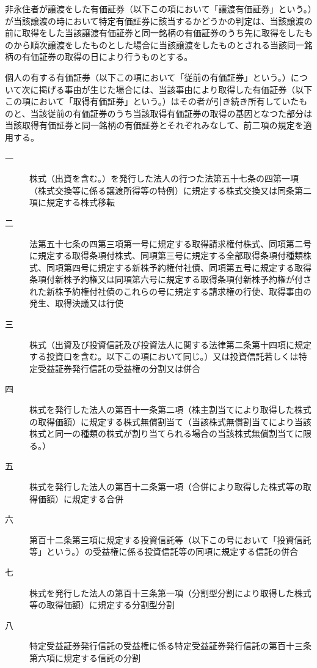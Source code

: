 \documentclass[twocolumn,a4j,10pt]{ltjtarticle}
\begin{document}
\begin{description}
\begin{description}
\end{description}
\item[\rensuji{2}]非永住者が譲渡をした有価証券（以下この項において「譲渡有価証券」という。）が当該譲渡の時において特定有価証券に該当するかどうかの判定は、当該譲渡の前に取得をした当該譲渡有価証券と同一銘柄の有価証券のうち先に取得をしたものから順次譲渡をしたものとした場合に当該譲渡をしたものとされる当該同一銘柄の有価証券の取得の日により行うものとする。
\item[\rensuji{3}]個人の有する有価証券（以下この項において「従前の有価証券」という。）について次に掲げる事由が生じた場合には、当該事由により取得した有価証券（以下この項において「取得有価証券」という。）はその者が引き続き所有していたものと、当該従前の有価証券のうち当該取得有価証券の取得の基因となつた部分は当該取得有価証券と同一銘柄の有価証券とそれぞれみなして、前二項の規定を適用する。
\begin{description}
\item[一]株式（出資を含む。）を発行した法人の行つた法第五十七条の四第一項（株式交換等に係る譲渡所得等の特例）に規定する株式交換又は同条第二項に規定する株式移転
\item[二]法第五十七条の四第三項第一号に規定する取得請求権付株式、同項第二号に規定する取得条項付株式、同項第三号に規定する全部取得条項付種類株式、同項第四号に規定する新株予約権付社債、同項第五号に規定する取得条項付新株予約権又は同項第六号に規定する取得条項付新株予約権が付された新株予約権付社債のこれらの号に規定する請求権の行使、取得事由の発生、取得決議又は行使
\item[三]株式（出資及び投資信託及び投資法人に関する法律第二条第十四項に規定する投資口を含む。以下この項において同じ。）又は投資信託若しくは特定受益証券発行信託の受益権の分割又は併合
\item[四]株式を発行した法人の第百十一条第二項（株主割当てにより取得した株式の取得価額）に規定する株式無償割当て（当該株式無償割当てにより当該株式と同一の種類の株式が割り当てられる場合の当該株式無償割当てに限る。）
\item[五]株式を発行した法人の第百十二条第一項（合併により取得した株式等の取得価額）に規定する合併
\item[六]第百十二条第三項に規定する投資信託等（以下この号において「投資信託等」という。）の受益権に係る投資信託等の同項に規定する信託の併合
\item[七]株式を発行した法人の第百十三条第一項（分割型分割により取得した株式等の取得価額）に規定する分割型分割
\item[八]特定受益証券発行信託の受益権に係る特定受益証券発行信託の第百十三条第六項に規定する信託の分割

\end{description}
\end{description}
\end{document}
